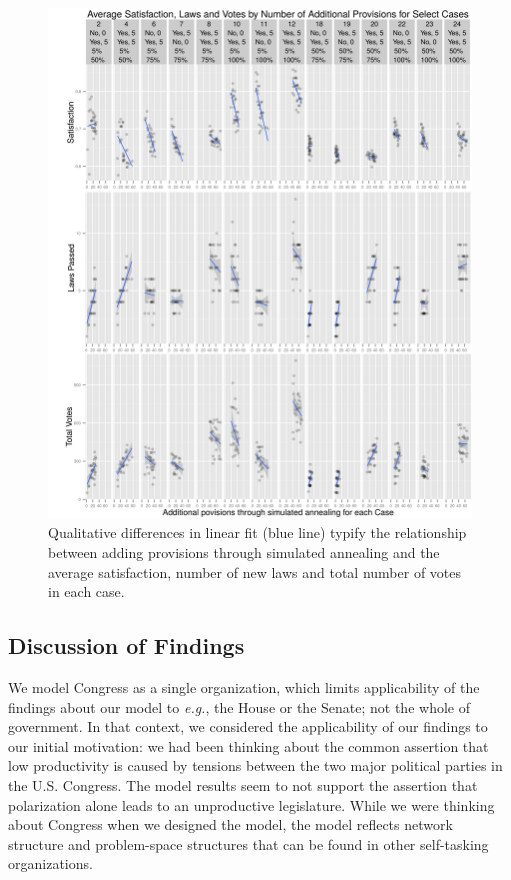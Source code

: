 \documentclass[pdftex,12pt]{llncs}
\begin{document}
\begin{figure}[h!]
\centering
\includegraphics[width=4.75in]{combinedCases_crop.pdf}
\caption[ ]{Qualitative differences in linear fit (blue line) typify the relationship between adding provisions through simulated annealing and the average satisfaction, number of new laws and total number of votes in each case.} 
\label{combined}
\end{figure}

\subsection{Discussion of Findings}
We model Congress as a single organization, which limits applicability of the findings about our model to \textit{e.g.}, the House or the Senate; not the whole of government.
In that context, we considered the applicability of our findings to our initial motivation: we had been thinking about the common assertion that low productivity is caused by tensions between the two major political parties in the U.S. Congress.  
The model results seem to not support the assertion that polarization alone leads to an unproductive legislature. 
While we were thinking about Congress when we designed the model, the model reflects network structure and problem-space structures that can be found in other self-tasking organizations.
\end{document}
